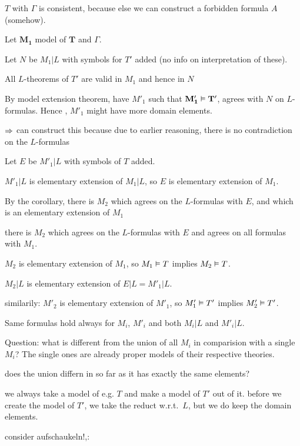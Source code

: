 $T$ with $\Gamma$ is consistent, because else we can construct a forbidden formula $A$ (somehow).
\bigskip

Let $\mathbf{ M_1 }$ model of $\mathbf T$ and $\Gamma$.

Let $N$ be $M_1 | L$ with symbols for $T'$ added (no info on interpretation of these).

All $L$-theorems of $T'$ are valid in $M_1$ and hence in $N$

By model extension theorem, have $M'_1$ such that $ \mathbf{M'_1 \vDash T'}$, agrees with $N$ on $L$-formulas.
Hence , $M'_1$ might have more domain elements.
\bigskip

$\Rightarrow$ can construct this because due to earlier reasoning, there is no contradiction on the $L$-formulas
\bigskip


Let $E$ be $M'_1|L$ with symbols of $T$ added.

$M'_1|L$ is elementary extension of $M_1|L$, so $E$ is elementary extension of $M_1$.

By the corollary,
there is $M_2$ which agrees on the $L$-formulas with $E$, and which is an elementary extension of $M_1$


there is $M_2$ which agrees on the $L$-formulas with $E$ and agrees on all formulas with $M_1$.

$M_2$ is elementary extension of $M_1$, so $M_1\vDash T$ implies $M_2 \vDash T$.

$M_2|L$ is elementary extension of $E|L = M'_1|L$.

\medskip

similarily:
$M'_2$ is elementary extension of $M'_1$, so $M'_1\vDash T'$ implies $M'_2 \vDash T'$.

\bigskip


Same formulas hold always for $M_i$, $M'_i$ and both $M_i|L$ and $M'_i|L$.

\bigskip

Question: what is different from the union of all $M_i$ in comparision with a single $M_i$?
The single ones are already proper models of their respective theories.

does the union differn in so far as it has exactly the same elements?

we always take a model of e.g. $T$ and make a model of $T'$ out of it. before we create the model of $T'$, we take the reduct w.r.t.\ $L$, but we do keep the domain elements.

consider aufschaukeln!,:

